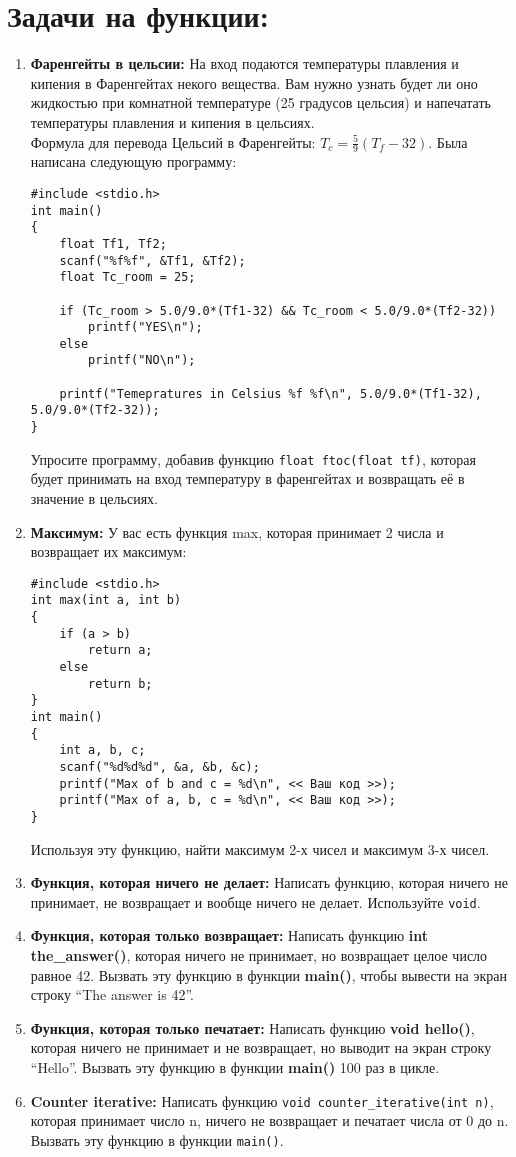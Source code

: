 \documentclass{article}
\begin{document}
\section*{Задачи на функции:}
\begin{enumerate}
\item \textbf{Фаренгейты в цельсии:} На вход подаются температуры плавления и кипения в Фаренгейтах некого вещества. Вам нужно узнать будет ли оно жидкостью при комнатной температуре (25 градусов цельсия) и напечатать температуры плавления и кипения в цельсиях.\\ Формула для перевода Цельсий в Фаренгейты: $T_c = \frac{5}{9}(T_f-32)$. Была написана следующую программу:
\begin{lstlisting}
#include <stdio.h>
int main()
{
	float Tf1, Tf2;
	scanf("%f%f", &Tf1, &Tf2);
	float Tc_room = 25;
	
	if (Tc_room > 5.0/9.0*(Tf1-32) && Tc_room < 5.0/9.0*(Tf2-32))
		printf("YES\n");
	else
		printf("NO\n");
	
	printf("Temepratures in Celsius %f %f\n", 5.0/9.0*(Tf1-32), 5.0/9.0*(Tf2-32));
}
\end{lstlisting}
Упросите программу, добавив функцию \texttt{float ftoc(float tf)}, которая будет принимать на вход температуру в фаренгейтах и возвращать её в значение в цельсиях.

\item \textbf{Максимум:} У вас есть функция max, которая принимает 2 числа и возвращает их максимум:
\begin{lstlisting}
#include <stdio.h>
int max(int a, int b)
{
	if (a > b)
		return a;
	else
		return b;
}
int main()
{
	int a, b, c;
	scanf("%d%d%d", &a, &b, &c);
	printf("Max of b and c = %d\n", << Ваш код >>);
	printf("Max of a, b, c = %d\n", << Ваш код >>);
}

\end{lstlisting}
Используя эту функцию, найти максимум 2-х чисел и максимум 3-х чисел.
\item \textbf{Функция, которая ничего не делает:} Написать функцию, которая ничего не принимает, не возвращает и вообще ничего не делает. Используйте \texttt{void}.
\item \textbf{Функция, которая только возвращает:} Написать функцию \textbf{int the\_answer()}, которая ничего не принимает, но возвращает целое число равное 42. Вызвать эту функцию в функции \textbf{main()}, чтобы вывести на экран строку ``The answer is 42''.
\item \textbf{Функция, которая только печатает:} Написать функцию \textbf{void hello()}, которая ничего не принимает и не возвращает, но выводит на экран строку ``Hello''. Вызвать эту функцию в функции \textbf{main()} 100 раз в цикле.
\item \textbf{Counter iterative:} Написать функцию \texttt{void counter\_iterative(int n)}, которая принимает число n, ничего не возвращает и печатает числа от 0 до n. Вызвать эту функцию в функции \texttt{main()}.


\end{enumerate}
\end{document}
